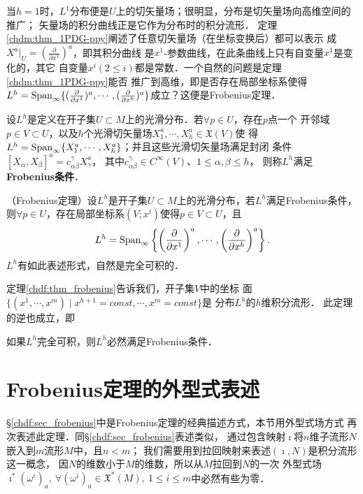 当$h=1$时，$L^1$分布便是$U$上的切矢量场；很明显，分布是切矢量场向高维空间的推广；
矢量场的积分曲线正是它作为分布时的积分流形．
定理\ref{chdm:thm_1PDG-ppy}阐述了任意切矢量场（在坐标变换后）都可以表示
成$X^a |_U = (\frac{\partial }{\partial x^1} )^a$，即其积分曲线
是$x^1$-参数曲线，在此条曲线上只有自变量$x^1$是变化的，其它
自变量$x^i(2\leqslant i)$都是常数．一个自然的问题是定理\ref{chdm:thm_1PDG-ppy}能否
推广到高维，即是否存在局部坐标系使得$L^h={\rm Span}_{\infty}\{(\frac{\partial }{\partial x^1} )^a,
\cdots,(\frac{\partial }{\partial x^h} )^a\}$成立？这便是Frobenius定理．

\begin{definition}\label{chdf:def_frobenius-conditions}
    设$L^h$是定义在开子集$U\subset M$上的光滑分布．若$\forall p\in U$，存在$p$点一个
    开邻域$p\in V\subset U$，以及$h$个光滑切矢量场$X_1^a,\cdots,X^a_h\in \mathfrak{X}(V)$使
    得$L^h={\rm Span}_{\infty}\{ X_1^a,\cdots,X^a_h\}$；并且这些光滑切矢量场满足封闭
    条件$[X_\alpha,X_\beta]^a=c_{\alpha\beta}^{\gamma} X_\gamma^a$，
    其中$c_{\alpha\beta}^{\gamma} \in C^\infty(V)$、$1\leqslant \alpha,\beta\leqslant h$，
    则称$L^h$满足{\heiti \bfseries Frobenius条件}．
\end{definition}


\begin{theorem}\label{chdf:thm_frobenius}
    （Frobenius定理）设$L^h$是开子集$U\subset M$上的光滑分布，若$L^h$满足Frobenius条件，
    则$\forall p\in U$，存在局部坐标系$(V;x^i)$使得$p\in V\subset U$，且
    \begin{equation}\label{chdf:eqn_frobenius-h}
        L^h={\rm Span}_{\infty}\left\{\left(\frac{\partial }{\partial x^1} \right)^a,
        \cdots,\left(\frac{\partial }{\partial x^h} \right)^a \right\}.
    \end{equation}
    $L^h$有如此表述形式，自然是完全可积的．
\end{theorem}
定理\ref{chdf:thm_frobenius}告诉我们，开子集$V$中的坐标
面$\{(x^1,\cdots,x^m) \mid x^{h+1}=const, \cdots, x^{m}=const\}$是
分布$L^h$的$h$维积分流形．
此定理的逆也成立，即
\begin{theorem}\label{chdf:thm_frobenius-converse}
    如果$L^h$完全可积，则$L^h$必然满足Frobenius条件．
\end{theorem}

\section{Frobenius定理的外型式表述}\label{chdf:sec_frobenius-ed}
\S\ref{chdf:sec_frobenius}中是Frobenius定理的经典描述方式，本节用外型式场方式
再次表述此定理．同\S\ref{chdf:sec_frobenius}表述类似，
通过包含映射$\imath$将$n$维子流形$N$嵌入到$m$流形$M$中，且$n < m$；
我们需要用到拉回映射来表述$(\imath,N)$是积分流形这一概念，
因$N$的维数小于$M$的维数，所以从$M$拉回到$N$的一次
外型式场$\imath^*(\omega^i)_a,\  \forall(\omega^i)_a\in\mathfrak{X}^*(M),
\ 1\leqslant i \leqslant m$中必然有些为零．

